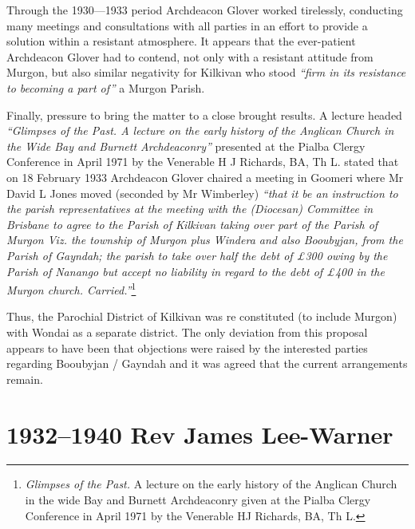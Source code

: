 Through the 1930---1933 period Archdeacon Glover worked tirelessly, conducting many meetings and consultations with all parties in an effort to provide a solution within a resistant atmosphere. It appears that the ever-patient Archdeacon Glover had to contend, not only with a resistant attitude from Murgon, but also similar negativity for Kilkivan who stood \emph{``firm in its resistance to becoming a part of''} a Murgon Parish.



Finally, pressure to bring the matter to a close brought results. A lecture headed \emph{``Glimpses of the Past. A lecture on the early history of the Anglican Church in the Wide Bay and Burnett Archdeaconry''} presented at the Pialba Clergy Conference in April 1971 by the Venerable H J Richards, BA, Th L. stated that on 18 February 1933 Archdeacon Glover chaired a meeting in Goomeri where Mr David L Jones moved (seconded by Mr Wimberley) \emph{``that it be an instruction to the parish representatives at the meeting with the (Diocesan) Committee in Brisbane to agree to the Parish of Kilkivan taking over part of the Parish of Murgon Viz. the township of Murgon plus Windera and also Booubyjan, from the Parish of Gayndah; the parish to take over half the debt of \pounds300 owing by the Parish of Nanango but accept no liability in regard to the debt of \pounds400 in the Murgon church. Carried.''}\footnote{\emph{Glimpses of the Past.} A lecture on the early history of the Anglican Church in the wide Bay and Burnett Archdeaconry given at the Pialba Clergy Conference in April 1971 by the Venerable HJ Richards, BA, Th L.}


\balance


Thus, the Parochial District of Kilkivan was re constituted (to include Murgon) with Wondai as a separate district. The only deviation from this proposal appears to have been that objections were raised by the interested parties regarding Booubyjan / Gayndah and it was agreed that the current arrangements remain.



\printendnotes[custom]
\setcounter{endnote}{0}




\chapter{1932--1940 Rev James Lee-Warner}
\nobalance


